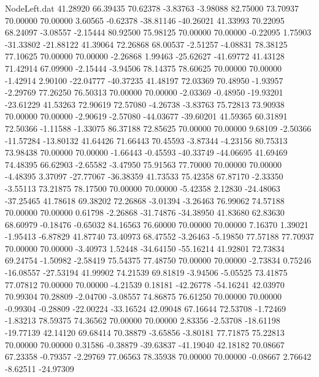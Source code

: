 \begin{filecontents}{NodeLeft.dat}
  41.28920   66.39435   70.62378    -3.83763   -3.98088   82.75000   73.70937   70.00000   70.00000    3.60565   -0.62378  -38.81146  -40.26021
  41.33993   70.22095   68.24097    -3.08557   -2.15444   80.92500   75.98125   70.00000   70.00000   -0.22095    1.75903  -31.33802  -21.88122
  41.39064   72.26868   68.00537    -2.51257   -4.08831   78.38125   77.10625   70.00000   70.00000   -2.26868    1.99463  -25.62627  -41.69772
  41.43128   71.42914   67.09900    -2.15444   -3.94506   78.14375   78.60625   70.00000   70.00000   -1.42914    2.90100  -22.04777  -40.37235
  41.48197   72.03369   70.48950    -1.93957   -2.29769   77.26250   76.50313   70.00000   70.00000   -2.03369   -0.48950  -19.93201  -23.61229
  41.53263   72.90619   72.57080    -4.26738   -3.83763   75.72813   73.90938   70.00000   70.00000   -2.90619   -2.57080  -44.03677  -39.60201
  41.59365   60.31891   72.50366    -1.11588   -1.33075   86.37188   72.85625   70.00000   70.00000    9.68109   -2.50366  -11.57284  -13.80132
  41.64426   71.66443   70.45593    -3.87344   -4.23156   80.75313   73.98438   70.00000   70.00000   -1.66443   -0.45593  -40.33749  -44.06695
  41.69469   74.48395   66.62903    -2.65582   -3.47950   75.91563   77.70000   70.00000   70.00000   -4.48395    3.37097  -27.77067  -36.38359
  41.73533   75.42358   67.87170    -2.33350   -3.55113   73.21875   78.17500   70.00000   70.00000   -5.42358    2.12830  -24.48063  -37.25465
  41.78618   69.38202   72.26868    -3.01394   -3.26463   76.99062   74.57188   70.00000   70.00000    0.61798   -2.26868  -31.74876  -34.38950
  41.83680   62.83630   68.60979    -0.18476   -0.65032   84.16563   76.60000   70.00000   70.00000    7.16370    1.39021   -1.95413   -6.87829
  41.87740   73.40973   68.47552    -3.26463   -5.19850   77.57188   77.70937   70.00000   70.00000   -3.40973    1.52448  -34.64150  -55.16214
  41.92801   72.73834   69.24754    -1.50982   -2.58419   75.54375   77.48750   70.00000   70.00000   -2.73834    0.75246  -16.08557  -27.53194
  41.99902   74.21539   69.81819    -3.94506   -5.05525   73.41875   77.07812   70.00000   70.00000   -4.21539    0.18181  -42.26778  -54.16241
  42.03970   70.99304   70.28809    -2.04700   -3.08557   74.86875   76.61250   70.00000   70.00000   -0.99304   -0.28809  -22.00224  -33.16524
  42.09048   67.16644   72.53708    -1.72469   -1.83213   78.59375   74.36562   70.00000   70.00000    2.83356   -2.53708  -18.61198  -19.77139
  42.14120   69.68414   70.38879    -3.65856   -3.80181   77.71875   75.22813   70.00000   70.00000    0.31586   -0.38879  -39.63837  -41.19040
  42.18182   70.08667   67.23358    -0.79357   -2.29769   77.06563   78.35938   70.00000   70.00000   -0.08667    2.76642   -8.62511  -24.97309

\end{filecontents}
